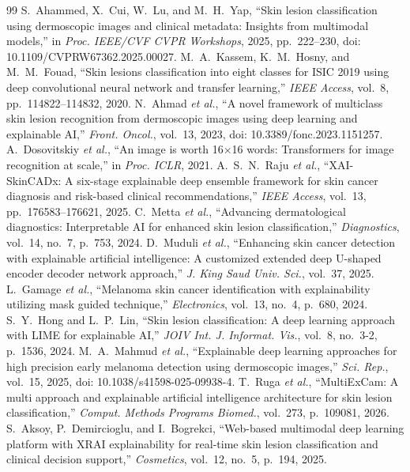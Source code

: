 \documentclass[journal]{IEEEtran}
\begin{document}
\begin{thebibliography}{99}
 S.~Ahammed, X.~Cui, W.~Lu, and M.~H.~Yap, ``Skin lesion classification using dermoscopic images and clinical metadata: Insights from multimodal models,'' in \textit{Proc. IEEE/CVF CVPR Workshops}, 2025, pp.~222--230, doi: 10.1109/CVPRW67362.2025.00027.
 M.~A.~Kassem, K.~M.~Hosny, and M.~M.~Fouad, ``Skin lesions classification into eight classes for ISIC 2019 using deep convolutional neural network and transfer learning,'' \textit{IEEE Access}, vol.~8, pp.~114822--114832, 2020.
 N.~Ahmad \textit{et al.}, ``A novel framework of multiclass skin lesion recognition from dermoscopic images using deep learning and explainable AI,'' \textit{Front. Oncol.}, vol.~13, 2023, doi: 10.3389/fonc.2023.1151257.
 A.~Dosovitskiy \textit{et al.}, ``An image is worth 16$\times$16 words: Transformers for image recognition at scale,'' in \textit{Proc. ICLR}, 2021.
 A.~S.~N.~Raju \textit{et al.}, ``XAI-SkinCADx: A six-stage explainable deep ensemble framework for skin cancer diagnosis and risk-based clinical recommendations,'' \textit{IEEE Access}, vol.~13, pp.~176583--176621, 2025.
 C.~Metta \textit{et al.}, ``Advancing dermatological diagnostics: Interpretable AI for enhanced skin lesion classification,'' \textit{Diagnostics}, vol.~14, no.~7, p.~753, 2024.
 D.~Muduli \textit{et al.}, ``Enhancing skin cancer detection with explainable artificial intelligence: A customized extended deep U-shaped encoder decoder network approach,'' \textit{J. King Saud Univ. Sci.}, vol.~37, 2025.
 L.~Gamage \textit{et al.}, ``Melanoma skin cancer identification with explainability utilizing mask guided technique,'' \textit{Electronics}, vol.~13, no.~4, p.~680, 2024.
 S.~Y.~Hong and L.~P.~Lin, ``Skin lesion classification: A deep learning approach with LIME for explainable AI,'' \textit{JOIV Int. J. Informat. Vis.}, vol.~8, no.~3-2, p.~1536, 2024.
 M.~A.~Mahmud \textit{et al.}, ``Explainable deep learning approaches for high precision early melanoma detection using dermoscopic images,'' \textit{Sci. Rep.}, vol.~15, 2025, doi: 10.1038/s41598-025-09938-4.
 T.~Ruga \textit{et al.}, ``MultiExCam: A multi approach and explainable artificial intelligence architecture for skin lesion classification,'' \textit{Comput. Methods Programs Biomed.}, vol.~273, p.~109081, 2026.
 S.~Aksoy, P.~Demircioglu, and I.~Bogrekci, ``Web-based multimodal deep learning platform with XRAI explainability for real-time skin lesion classification and clinical decision support,'' \textit{Cosmetics}, vol.~12, no.~5, p.~194, 2025.

\end{thebibliography}
\end{document}
